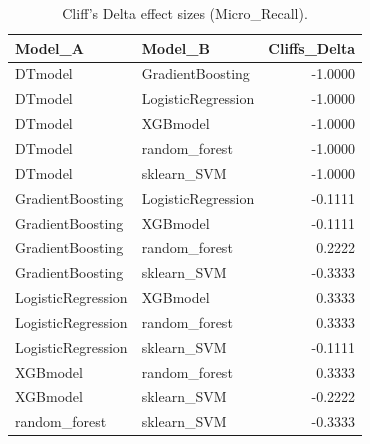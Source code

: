 \begin{table}[t]
\centering
\begin{tabular}{llr}
\toprule
Model_A & Model_B & Cliffs_Delta \\
\midrule
DTmodel & GradientBoosting & -1.0000 \\
DTmodel & LogisticRegression & -1.0000 \\
DTmodel & XGBmodel & -1.0000 \\
DTmodel & random_forest & -1.0000 \\
DTmodel & sklearn_SVM & -1.0000 \\
GradientBoosting & LogisticRegression & -0.1111 \\
GradientBoosting & XGBmodel & -0.1111 \\
GradientBoosting & random_forest & 0.2222 \\
GradientBoosting & sklearn_SVM & -0.3333 \\
LogisticRegression & XGBmodel & 0.3333 \\
LogisticRegression & random_forest & 0.3333 \\
LogisticRegression & sklearn_SVM & -0.1111 \\
XGBmodel & random_forest & 0.3333 \\
XGBmodel & sklearn_SVM & -0.2222 \\
random_forest & sklearn_SVM & -0.3333 \\
\bottomrule
\end{tabular}
\caption{Cliff's Delta effect sizes (Micro_Recall).}
\label{tab:cliffs_Micro_Recall}
\end{table}